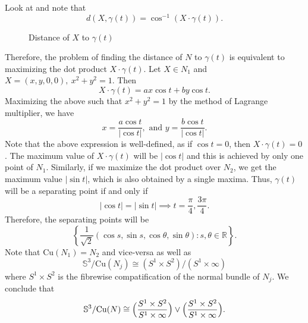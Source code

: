 \begin{eg}
    \noindent Look at  and note that 
    \begin{displaymath}
        d(X,\gamma(t)) = \cos^{-1}(X\cdot \gamma(t)).
    \end{displaymath}
    \begin{figure}[!htb]
        \centering
        \caption{Distance of $X$ to $\gamma(t)$  \label{fig:DistanceFromLink}}
    \end{figure}
    \noindent Therefore, the problem of finding the distance of $N$ to $\gamma(t)$ is equivalent to maximizing the dot product $X\cdot \gamma(t)$.
    Let $X\in N_1$ and $X=(x,y,0,0),~x^2+y^2=1$. Then 
    \begin{displaymath}
        X\cdot \gamma(t) = ax\cos t+by\cos t.
    \end{displaymath} 
    Maximizing the above such that $x^2+y^2=1$ by the method of Lagrange multiplier, we have
    \begin{displaymath}
        x = \dfrac{a\cos t}{|\cos t|}, \text{ and } y = \dfrac{b\cos t}{|\cos t|}.
    \end{displaymath}
    Note that the above expression is well-defined, as if $\cos t =0$, then $X\cdot \gamma(t)=0$. The maximum value of $X\cdot \gamma(t)$ will be $|\cos t|$ and this is achieved by only one point of $N_1$. Similarly, if we maximize the dot product over $N_2$, we get the maximum value $|\sin t|$, which is also obtained by a single maxima. Thus, $\gamma(t)$ will be a separating point if and only if 
    \begin{displaymath}
        |\cos t| =|\sin t| \implies t = \dfrac{\pi}{4},\dfrac{3\pi}{4}.
    \end{displaymath}
    Therefore, the separating points will be
    \begin{displaymath}
        \left\{\frac{1}{\sqrt{2}}(\cos s,\sin s,\cos \theta,\sin \theta):s,\theta\in \mathbb{R}\right\}.
    \end{displaymath}
    \vspace{0.3cm}
    \hf Note that $\mathrm{Cu}(N_1)=N_2$ and vice-versa as well as 
    \begin{displaymath}
        \mathbb{S}^3/\mathrm{Cu}(N_j)\cong (S^1\times S^2)/(S^1\times \infty)
    \end{displaymath}
    where $S^1\times S^2$ is the fibrewise compatification of the normal bundle of $N_j$. We conclude that 
    \begin{displaymath}
        \mathbb{S}^3/\mathrm{Cu}(N)\cong \Big(\frac{S^1\times S^2}{S^1\times \infty}\Big)\vee \Big(\frac{S^1\times S^2}{S^1\times \infty}\Big).
    \end{displaymath}
\end{eg}

